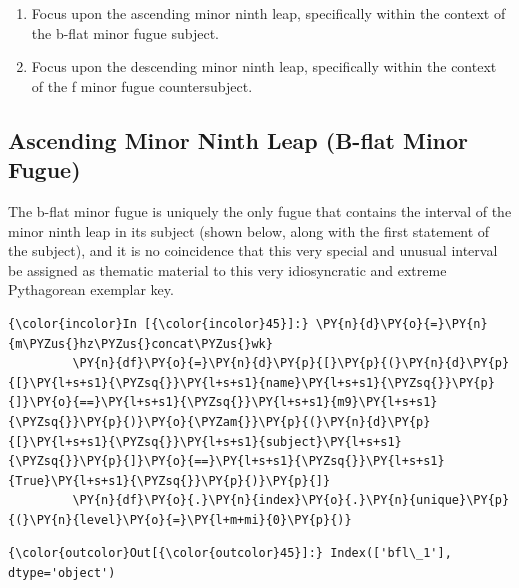 \begin{enumerate}
\def\labelenumi{\arabic{enumi}.}
\tightlist
\item
  Focus upon the ascending minor ninth leap, specifically within the
  context of the b-flat minor fugue subject.
\item
  Focus upon the descending minor ninth leap, specifically within the
  context of the f minor fugue countersubject.
\end{enumerate}

    \subsection{Ascending Minor Ninth Leap (B-flat Minor
Fugue)}\label{ascending-minor-ninth-leap-b-flat-minor-fugue}

The b-flat minor fugue is uniquely the only fugue that contains the
interval of the minor ninth leap in its subject (shown below, along with
the first statement of the subject), and it is no coincidence that this
very special and unusual interval be assigned as thematic material to
this very idiosyncratic and extreme Pythagorean exemplar key.

    \begin{Verbatim}[commandchars=\\\{\}]
{\color{incolor}In [{\color{incolor}45}]:} \PY{n}{d}\PY{o}{=}\PY{n}{m\PYZus{}hz\PYZus{}concat\PYZus{}wk}
         \PY{n}{df}\PY{o}{=}\PY{n}{d}\PY{p}{[}\PY{p}{(}\PY{n}{d}\PY{p}{[}\PY{l+s+s1}{\PYZsq{}}\PY{l+s+s1}{name}\PY{l+s+s1}{\PYZsq{}}\PY{p}{]}\PY{o}{==}\PY{l+s+s1}{\PYZsq{}}\PY{l+s+s1}{m9}\PY{l+s+s1}{\PYZsq{}}\PY{p}{)}\PY{o}{\PYZam{}}\PY{p}{(}\PY{n}{d}\PY{p}{[}\PY{l+s+s1}{\PYZsq{}}\PY{l+s+s1}{subject}\PY{l+s+s1}{\PYZsq{}}\PY{p}{]}\PY{o}{==}\PY{l+s+s1}{\PYZsq{}}\PY{l+s+s1}{True}\PY{l+s+s1}{\PYZsq{}}\PY{p}{)}\PY{p}{]}
         \PY{n}{df}\PY{o}{.}\PY{n}{index}\PY{o}{.}\PY{n}{unique}\PY{p}{(}\PY{n}{level}\PY{o}{=}\PY{l+m+mi}{0}\PY{p}{)}
\end{Verbatim}
\begin{Verbatim}[commandchars=\\\{\}]
{\color{outcolor}Out[{\color{outcolor}45}]:} Index(['bfl\_1'], dtype='object')
\end{Verbatim}


